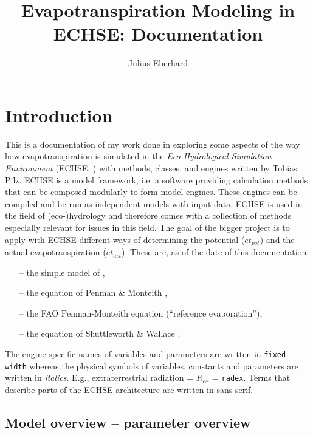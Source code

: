 \documentclass{scrreprt}
\title{Evapotranspiration Modeling in ECHSE: Documentation}
\author{Julius Eberhard}
\begin{document}
\maketitle
\tableofcontents


\chapter{Introduction} \label{ch:introduction}

This is a documentation of my work done in exploring some aspects of the way how evapotranspiration is simulated in the \emph{Eco-Hydrological Simulation Environment} (ECHSE, \citealt{kneis15}) with methods, classes, and engines written by Tobias Pilz.
ECHSE is a model framework, i.e. a software providing calculation methods that can be composed modularly to form model engines. These engines can be compiled and be run as independent models with input data.
ECHSE is used in the field of (eco-)hydrology and therefore comes with a collection of methods especially relevant for issues in this field.
The goal of the bigger project is to apply with ECHSE different ways of determining the potential ($et_{pot}$) and the actual evapotranspiration ($et_{act}$).
These are, as of the date of this documentation:
\begin{itemize}
  \item[--] the simple model of \citet{makkink57},
  \item[--] the equation of Penman \& Monteith \citep{monteith65},
  \item[--] the FAO Penman-Monteith equation (``reference evaporation''),
  \item[--] the equation of Shuttleworth \& Wallace \citep{shuttleworth85}.
\end{itemize}

The engine-specific names of variables and parameters are written in \verb!fixed-width! whereas the physical symbols of variables, constants and parameters are written in \textit{italics}.
E.g., extraterrestrial radiation = $R_{ex}$ = \verb!radex!.
Terms that describe parts of the ECHSE architecture are written in \textsf{sans-serif}.

\section{Model overview -- parameter overview} \label{sec:intro_overview}
\end{document}
